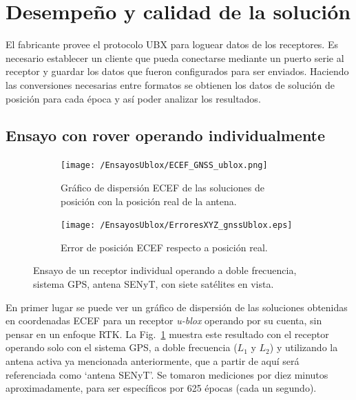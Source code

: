 \documentclass[a4paper,12pt,oneside,onecolumn,final,openright]{book}%
\begin{document}
\section{Desempeño y calidad de la solución}
	El fabricante provee el protocolo UBX para loguear datos de los receptores. Es necesario establecer un cliente que pueda conectarse mediante un puerto serie al receptor y guardar los datos que fueron configurados para ser enviados. Haciendo las conversiones necesarias entre formatos se obtienen los datos de solución de posición para cada época y así poder analizar los resultados.
\subsection{Ensayo con rover operando individualmente}\label{sec:rover_alone}
\begin{figure}

\begin{subfigure}{1\linewidth}
\centering
  	\texttt{[image: /EnsayosUblox/ECEF\_GNSS\_ublox.png]}
  	\caption{Gráfico de dispersión ECEF de las soluciones de posición con la posición real de la antena.}
    \label{fig:scatter_ublox_GNSS}
\end{subfigure}

\begin{subfigure}{1\linewidth}
\centering
 	\texttt{[image: /EnsayosUblox/ErroresXYZ\_gnssUblox.eps]}
 	\caption{Error de posición ECEF respecto a posición real.}
  	\label{fig:error_ublox_GNSS}

\end{subfigure}
\caption{Ensayo de un receptor individual operando a doble frecuencia, sistema GPS, antena SENyT, con siete satélites en vista.}
\label{fig:ensayoGNSS_ublox}
\end{figure}
	En primer lugar se puede ver un gráfico de dispersión de las soluciones obtenidas en coordenadas ECEF para un receptor \textit{u-blox} operando por su cuenta, sin pensar en un enfoque RTK. La Fig.~\ref{fig:scatter_ublox_GNSS} muestra este resultado con el receptor operando solo con el sistema GPS, a doble frecuencia ($L_1$ y $L_2$) y utilizando la antena activa ya mencionada anteriormente, que a partir de aquí será referenciada como `antena SENyT'. Se tomaron mediciones por diez minutos aproximadamente, para ser específicos por 625 épocas (cada un segundo).
\end{document}
